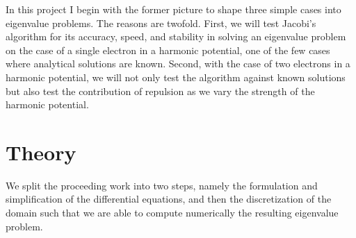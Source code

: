 \documentclass[11pt,a4paper]{article}
\begin{document}
In this project I begin with the former picture to shape three simple cases into eigenvalue problems. The reasons are twofold. First, we will test Jacobi's algorithm for its accuracy, speed, and stability in solving an eigenvalue problem on the case of a single electron in a harmonic potential, one of the few cases where analytical solutions are known. Second, with the case of two electrons in a harmonic potential, we will not only test the algorithm against known solutions but also test the contribution of repulsion as we vary the strength of the harmonic potential. 

\section{Theory}
We split the proceeding work into two steps, namely the formulation and simplification of the differential equations, and then the discretization of the domain such that we are able to compute numerically the resulting eigenvalue problem.
\end{document}
